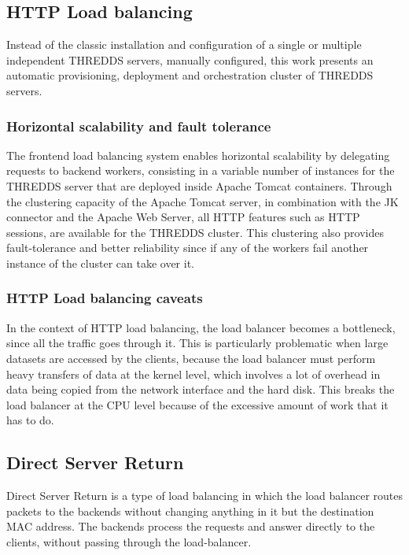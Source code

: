 \documentclass[a4paper,12pt]{article}
\begin{document}
\subsection{HTTP Load balancing}

Instead of the classic installation and configuration of a single or multiple independent THREDDS servers, manually configured, this work presents an automatic provisioning, deployment and orchestration cluster of THREDDS servers.

\subsubsection{Horizontal scalability and fault tolerance}

The frontend load balancing system enables horizontal scalability by delegating requests to backend workers, consisting in a variable number of instances for the THREDDS server that are deployed inside Apache Tomcat containers. Through the clustering capacity of the Apache Tomcat server, in combination with the JK connector and the Apache Web Server, all HTTP features such as HTTP sessions, are available for the THREDDS cluster. This clustering also provides fault-tolerance and better reliability since if any of the workers fail another instance of the cluster can take over it.

\subsubsection{HTTP Load balancing caveats}

In the context of HTTP load balancing, the load balancer becomes a bottleneck, since all the traffic goes through it. This is particularly problematic when large datasets are accessed by the clients, because the load balancer must perform heavy transfers of data at the kernel level, which involves a lot of overhead in data being copied from the network interface and the hard disk. This breaks the load balancer at the CPU level because of the excessive amount of work that it has to do.

\subsection{Direct Server Return}

Direct Server Return is a type of load balancing in which the load balancer routes packets to the backends without changing anything in it but the destination MAC address. The backends process the requests and answer directly to the clients, without passing through the load-balancer.
\end{document}
